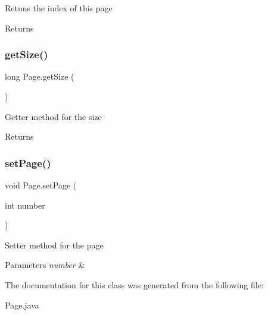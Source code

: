 Retuns the index of this page \begin{DoxyReturn}{Returns}

\end{DoxyReturn}
\mbox{\label{class_page_a88b503df31b5ae74bf9fa25282a556e2}} 
\subsubsection{\texorpdfstring{get\+Size()}{getSize()}}
{\footnotesize\ttfamily long Page.\+get\+Size (\begin{DoxyParamCaption}{ }\end{DoxyParamCaption})\hspace{0.3cm}{\ttfamily [inline]}}

Getter method for the size \begin{DoxyReturn}{Returns}

\end{DoxyReturn}
\mbox{\label{class_page_a2b249e5231e486b2151fb58c49921bc7}} 
\subsubsection{\texorpdfstring{set\+Page()}{setPage()}}
{\footnotesize\ttfamily void Page.\+set\+Page (\begin{DoxyParamCaption}\item[{int}]{number }\end{DoxyParamCaption})\hspace{0.3cm}{\ttfamily [inline]}}

Setter method for the page 
\begin{DoxyParams}{Parameters}
{\em number} & \\
\hline
\end{DoxyParams}


The documentation for this class was generated from the following file\+:\begin{DoxyCompactItemize}
\item 
Page.\+java\end{DoxyCompactItemize}

